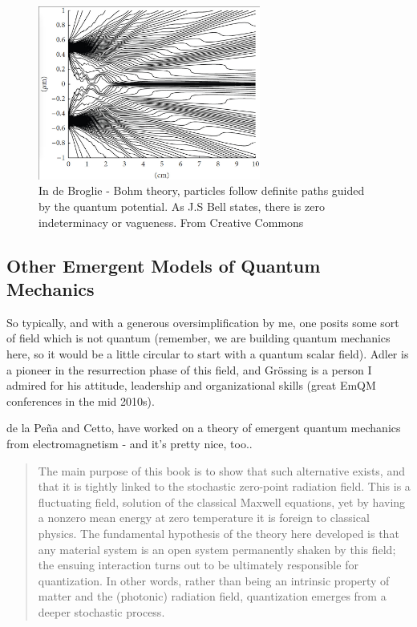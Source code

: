 \documentclass[../rzero]{subfiles}
\begin{document}
\begin{figure}\label{bohm-trajectories-image}
\includegraphics[width=0.65\textwidth]{chapters/images/bohmian-trajectories.png}
\caption{In de Broglie - Bohm theory, particles follow definite paths guided by the quantum potential. As J.S Bell states, there is zero indeterminacy or vagueness.   From\cite{FileBohmianTrajectories2001} Creative Commons}
\end{figure}




\subsection{Other Emergent Models of Quantum Mechanics}

So typically, and with a generous oversimplification by me, one posits some sort of field which is not quantum (remember, we are building quantum mechanics here, so it would be a little circular to  start with a quantum scalar field). Adler\cite{adlerQuantumTheoryEmergent2004} is a pioneer in the resurrection phase of this field, and Grössing is a person I admired for his attitude, leadership and organizational skills (great EmQM conferences in the mid 2010s)\cite{Grossing2012}. 

de la Peña and Cetto, have worked on a theory of emergent quantum mechanics from electromagnetism - and it's pretty nice, too.\cite{DelaPena2015}.

\begin{quotation}
	The main purpose of this book is to show that such alternative exists, and that it is tightly linked to the stochastic zero-point radiation field. This is a fluctuating field, solution of the classical Maxwell equations, yet by having a nonzero mean energy at zero temperature it is foreign to classical physics. The fundamental hypothesis of the theory here developed is that any material system is an open system permanently shaken by this field; the ensuing interaction turns out to be ultimately responsible for quantization. In other words, rather than being an intrinsic property of matter and the (photonic) radiation field, quantization emerges from a deeper stochastic process.
\end{quotation}
\end{document}
